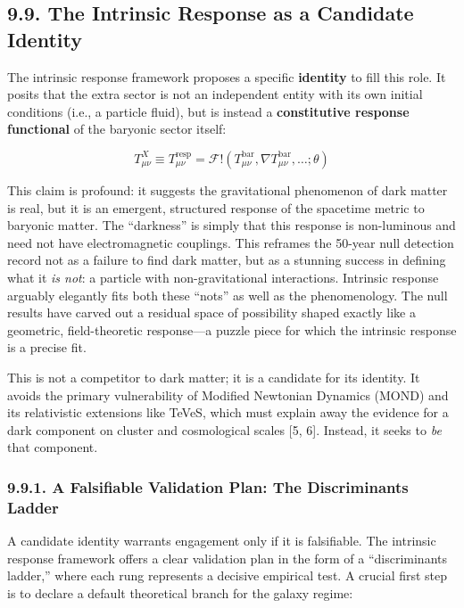 \subsection{9.9. The Intrinsic Response as a Candidate Identity}\label{the-intrinsic-response-as-a-candidate-identity}

The intrinsic response framework proposes a specific \textbf{identity} to fill this role. It posits that the extra sector is not an independent entity with its own initial conditions (i.e., a particle fluid), but is instead a \textbf{constitutive response functional} of the baryonic sector itself:

\[T_{\mu\nu}^{X} \equiv T_{\mu\nu}^{\text{resp}}\mathcal{= F}\text{!}\left( T_{\mu\nu}^{\text{bar}},\nabla T_{\mu\nu}^{\text{bar}},\ldots;\theta \right)\]

This claim is profound: it suggests the gravitational phenomenon of dark matter is real, but it is an emergent, structured response of the spacetime metric to baryonic matter. The ``darkness'' is simply that this response is non-luminous and need not have electromagnetic couplings. This reframes the 50-year null detection record not as a failure to find dark matter, but as a stunning success in defining what it \emph{is not}: a particle with non-gravitational interactions. Intrinsic response arguably elegantly fits both these ``nots'' as well as the phenomenology. The null results have carved out a residual space of possibility shaped exactly like a geometric, field-theoretic response---a puzzle piece for which the intrinsic response is a precise fit.

This is not a competitor to dark matter; it is a candidate for its identity. It avoids the primary vulnerability of Modified Newtonian Dynamics (MOND) and its relativistic extensions like TeVeS, which must explain away the evidence for a dark component on cluster and cosmological scales {[}5, 6{]}. Instead, it seeks to \emph{be} that component.

\subsubsection{9.9.1. A Falsifiable Validation Plan: The Discriminants Ladder}\label{a-falsifiable-validation-plan-the-discriminants-ladder}

A candidate identity warrants engagement only if it is falsifiable. The intrinsic response framework offers a clear validation plan in the form of a ``discriminants ladder,'' where each rung represents a decisive empirical test. A crucial first step is to declare a default theoretical branch for the galaxy regime:

